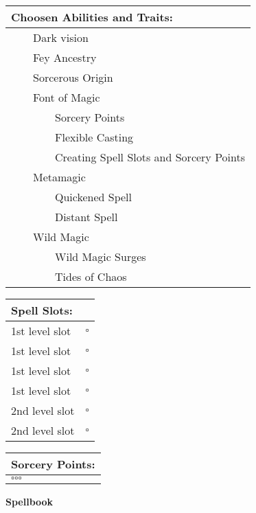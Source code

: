 \documentclass[11pt]{article}
\newcommand{\available}{$\square$}
\newcommand{\tabitem}{~~\llap{--}~~}
\newcommand{\tabtabitem}{~~~~~~\llap{$\bullet$}~~}
\begin{document}
\begin{multicols}{2}
\noindent \begin{tabularx}{95mm}{@{}l}
{\Large \textbf{Choosen Abilities and Traits:}} \\
\hline
\tabitem Dark vision \\
\tabitem Fey Ancestry \\
\tabitem Sorcerous Origin \\
\tabitem Font of Magic \\
\tabtabitem Sorcery Points \\
\tabtabitem Flexible Casting \\
\tabtabitem Creating Spell Slots and Sorcery Points \\
\tabitem Metamagic \\
\tabtabitem Quickened Spell \\
\tabtabitem Distant Spell \\
\tabitem Wild Magic \\
\tabtabitem Wild Magic Surges \\
\tabtabitem Tides of Chaos
		\end{tabularx}

\vspace{4mm}

\noindent \begin{tabularx}{95mm}{@{}l c}
{\Large \textbf{Spell Slots:}} & \\
\hline
1st level slot & \available \\
1st level slot & \available \\
1st level slot & \available \\
1st level slot & \available \\
2nd level slot & \available \\
2nd level slot & \available
		\end{tabularx}

\vspace{4mm}

\noindent \begin{tabularx}{95mm}{@{}l}
{\Large \textbf{Sorcery Points:}} \\
\hline
\available \available \available
		\end{tabularx}
	\end{multicols}

\clearpage

	\begin{center}
{\LARGE \textbf{Spellbook}}
	\end{center}
\end{document}

